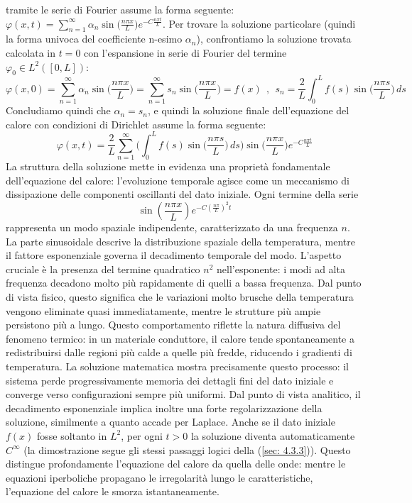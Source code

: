 \documentclass[a4paper,12pt]{report}
\begin{document}
tramite le serie di Fourier assume la forma seguente: $\varphi(x,t)=\displaystyle\sum_{n=1}^\infty\alpha_n\sin\bigg(\frac{n\pi x}{L}\bigg) e^{-C\frac{n\pi t}{L}}$.
Per trovare la soluzione particolare (quindi la forma univoca del coefficiente n-esimo $\alpha_n$), confrontiamo la soluzione trovata calcolata in $t=0$ con l'espansione in serie di Fourier del termine $\varphi_0\in L^2([0,L])$:
\[\varphi(x,0)=\sum_{n=1}^\infty\alpha_n\sin\bigg(\frac{n\pi x}{L}\bigg)=\sum_{n=1}^\infty s_n\sin\bigg(\frac{n\pi x}{L}\bigg)=f(x) \ \ , \ \ s_n=\frac{2}{L}\int_0^Lf(s)\sin\bigg(\frac{n\pi s}{L}\bigg)\,ds\]
Concludiamo quindi che $\alpha_n=s_n$, e quindi la soluzione finale dell'equazione del calore con condizioni di Dirichlet assume la forma seguente:
\[\varphi(x,t)=\frac{2}{L}\sum_{n=1}^\infty\bigg(\int_0^Lf(s)\sin\bigg(\frac{n\pi s}{L}\bigg)\,ds\bigg)\sin\bigg(\frac{n\pi x}{L}\bigg)e^{-C\frac{n\pi t }{L}}\]
La struttura della soluzione mette in evidenza una proprietà fondamentale dell’equazione del calore: l’evoluzione temporale agisce come un meccanismo di dissipazione delle componenti oscillanti del dato iniziale. Ogni termine della serie
\[
\sin\!\left(\frac{n\pi x}{L}\right)e^{-C\left(\frac{n\pi}{L}\right)^2 t}
\]
rappresenta un modo spaziale indipendente, caratterizzato da una frequenza \(n\). La parte sinusoidale descrive la distribuzione spaziale della temperatura, mentre il fattore esponenziale governa il decadimento temporale del modo. L’aspetto cruciale è la presenza del termine quadratico \(n^2\) nell’esponente: i modi ad alta frequenza decadono molto più rapidamente di quelli a bassa frequenza. Dal punto di vista fisico, questo significa che le variazioni molto brusche della temperatura vengono eliminate quasi immediatamente, mentre le strutture più ampie persistono più a lungo. 
Questo comportamento riflette la natura diffusiva del fenomeno termico: in un materiale conduttore, il calore tende spontaneamente a redistribuirsi dalle regioni più calde a quelle più fredde, riducendo i gradienti di temperatura. La soluzione matematica mostra precisamente questo processo: il sistema perde progressivamente memoria dei dettagli fini del dato iniziale e converge verso configurazioni sempre più uniformi.
Dal punto di vista analitico, il decadimento esponenziale implica inoltre una forte regolarizzazione della soluzione, similmente a quanto accade per Laplace. Anche se il dato iniziale \(f(x)\) fosse soltanto in \(L^2\), per ogni \(t>0\) la soluzione diventa automaticamente \(C^\infty\) (la dimostrazione segue gli stessi passaggi logici della (\ref{sec: 4.3.3})). Questo distingue profondamente l’equazione del calore da quella delle onde: mentre le equazioni iperboliche propagano le irregolarità lungo le caratteristiche, l’equazione del calore le smorza istantaneamente.
\end{document}
